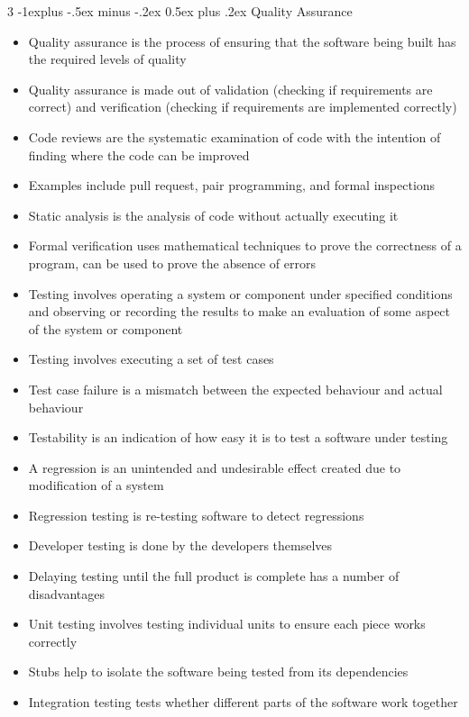 \documentclass[10pt, landscape]{article}
\makeatletter
\renewcommand{\section}{\@startsection{section}{1}{0mm}%
                                {-1ex plus -.5ex minus -.2ex}%
                                {0.5ex plus .2ex}%
                                {\normalfont\large\bfseries}}
\renewcommand{\section}{\@startsection{section}{2}{0mm}%
                                {-1explus -.5ex minus -.2ex}%
                                {0.5ex plus .2ex}%
                                {\normalfont\normalsize\bfseries}}
\makeatother
\begin{document}
\begin{multicols*}{3}
\section{Quality Assurance}
\begin{itemize}
    \item Quality assurance is the process of ensuring that the software being built has the required levels of quality
    \item Quality assurance is made out of validation (checking if requirements are correct) and verification (checking if requirements are implemented correctly)
    \item Code reviews are the systematic examination of code with the intention of finding where the code can be improved
    \item Examples include pull request, pair programming, and formal inspections
    \item Static analysis is the analysis of code without actually executing it
    \item Formal verification uses mathematical techniques to prove the correctness of a program, can be used to prove the absence of errors
    \item Testing involves operating a system or component under specified conditions and observing or recording the results to make an evaluation of some aspect of the system or component
    \item Testing involves executing a set of test cases
    \item Test case failure is a mismatch between the expected behaviour and actual behaviour
    \item Testability is an indication of how easy it is to test a software under testing
    \item A regression is an unintended and undesirable effect created due to modification of a system
    \item Regression testing is re-testing software to detect regressions
    \item Developer testing is done by the developers themselves
    \item Delaying testing until the full product is complete has a number of disadvantages
    \item Unit testing involves testing individual units to ensure each piece works correctly
    \item Stubs help to isolate the software being tested from its dependencies
    \item Integration testing tests whether different parts of the software work together

\end{itemize}
\end{multicols*}
\end{document}
